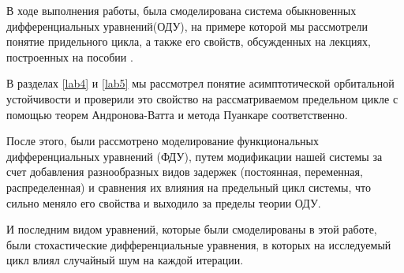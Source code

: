 \Conclusion %
В ходе выполнения работы, была смоделирована система
обыкновенных дифференциальных уравнений(ОДУ), на примере которой
мы рассмотрели понятие придельного цикла, а
также его свойств, обсужденных на лекциях, построенных
на пособии \cite{bookdiff}.

В разделах \ref{lab4} и \ref{lab5} мы рассмотрел понятие асимптотической
орбитальной устойчивости и проверили это свойство на рассматриваемом
предельном цикле с помощью теорем Андронова-Ватта и метода
Пуанкаре соответственно.

После этого, были рассмотрено моделирование функциональных
дифференциальных уравнений (ФДУ)\cite{bookananlyz}, путем модификации
нашей системы за счет добавления разнообразных видов задержек
(постоянная, переменная, распределенная) и сравнения их влияния
на предельный цикл системы, что сильно меняло его свойства
и выходило за пределы теории ОДУ.

И последним видом уравнений, которые были смоделированы в
этой работе, были стохастические дифференциальные уравнения,
в которых на исследуемый цикл влиял случайный шум на каждой
итерации.

